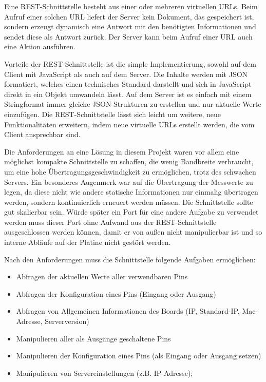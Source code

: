 Eine REST-Schnittstelle besteht aus einer oder mehreren virtuellen URLs. Beim Aufruf einer
solchen URL liefert der Server kein Dokument, das gespeichert ist, sondern erzeugt
dynamisch eine Antwort mit den benötigten Informationen und sendet diese als Antwort
zurück. Der Server kann beim Aufruf einer URL auch eine Aktion ausführen.

Vorteile der REST-Schnittstelle ist die simple Implementierung, sowohl auf dem Client mit
JavaScript als auch auf dem Server. Die Inhalte werden mit JSON formatiert, welches einen
technisches Standard darstellt und sich in JavaScript direkt in ein Objekt umwandeln
lässt. Auf dem Server ist es einfach mit einem Stringformat immer gleiche JSON Strukturen
zu erstellen und nur aktuelle Werte einzufügen. Die REST-Schnittstelle lässt sich leicht
um weitere, neue Funktionalitäten erweitern, indem neue virtuelle URLs erstellt werden, die
vom Client ansprechbar sind.

Die Anforderungen an eine Lösung in diesem Projekt waren vor allem eine möglichst kompakte
Schnittstelle zu schaffen, die wenig Bandbreite verbraucht, um eine hohe
Übertragungsgeschwindigkeit zu ermöglichen, trotz des schwachen Servers. Ein besonderes
Augenmerk war auf die Übertragung der Messwerte zu legen, da diese nicht wie andere
statische Informationen nur einmalig übertragen werden, sondern kontinuierlich erneuert
werden müssen. Die Schnittstelle sollte gut skalierbar sein. Würde später ein Port für
eine andere Aufgabe zu verwendet werden muss dieser Port ohne Aufwand aus der
REST-Schnittstelle ausgeschlossen werden können, damit er von außen nicht manipulierbar
ist und so interne Abläufe auf der Platine nicht gestört werden.

Nach den Anforderungen muss die Schnittstelle folgende Aufgaben ermöglichen:
\begin{itemize}
  \item Abfragen der aktuellen Werte aller verwendbaren Pins
  \item Abfragen der Konfiguration eines Pins (Eingang oder Ausgang)
  \item Abfragen von Allgemeinen Informationen des Boards (IP, Standard-IP, Mac-Adresse,
  Serverversion)
  \item Manipulieren aller als Ausgänge geschaltene Pins
  \item Manipulieren der Konfiguration eines Pins (als Eingang oder Ausgang setzen)
  \item Manipulieren von Servereinstellungen (z.B. IP-Adresse);
\end{itemize}

